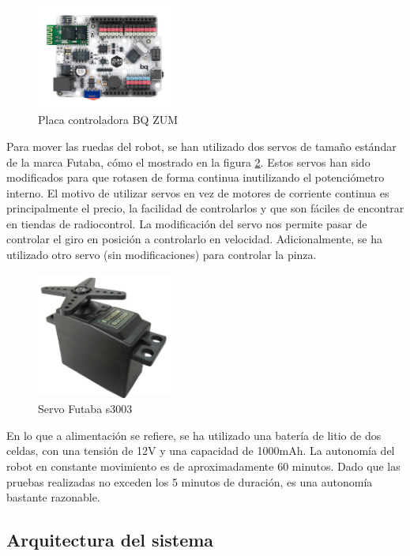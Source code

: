 \begin{figure}[H]
        \centering
        \includegraphics[width=0.4\textwidth]{images/zum.jpg}
        \caption{Placa controladora BQ ZUM}
        \label{fig:zum}
\end{figure} 

Para mover las ruedas del robot, se han utilizado dos servos de tamaño estándar de la marca Futaba, cómo el mostrado en la figura \ref{fig:futaba}. Estos servos han sido modificados para que rotasen de forma continua inutilizando el potenciómetro interno. El motivo de utilizar servos en vez de motores de corriente continua es principalmente el precio, la facilidad de controlarlos y que son fáciles de encontrar en tiendas de radiocontrol. La modificación del servo nos permite pasar de controlar el giro en posición a controlarlo en velocidad. Adicionalmente, se ha utilizado otro servo (sin modificaciones) para controlar la pinza.

\begin{figure}[H]
        \centering
        \includegraphics[width=0.4\textwidth]{images/futaba.jpg}
        \caption{Servo Futaba s3003}
        \label{fig:futaba}
\end{figure} 
En lo que a alimentación se refiere, se ha utilizado una batería de litio de dos celdas, con una tensión de 12V y una capacidad de 1000mAh. La autonomía del robot en constante movimiento es de aproximadamente 60 minutos. Dado que las pruebas realizadas no exceden los 5 minutos de duración, es una autonomía bastante razonable.

\subsection{Arquitectura del sistema}

